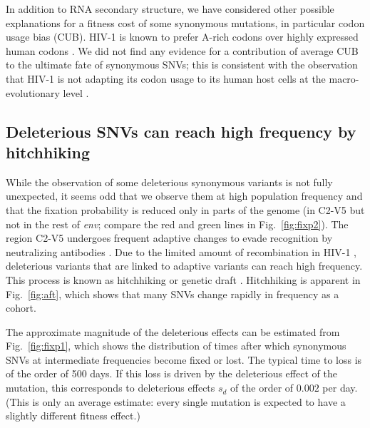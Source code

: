 \documentclass[11pt]{article}
\newcommand{\FIG}[1]{Fig.~\ref{fig:#1}}
\newcommand{\env}{\textit{env}}
\newcommand{\shankaregion}{C2-V5}
\begin{document}
In addition to RNA secondary structure, we have considered other possible
explanations for a fitness cost of some synonymous mutations, in particular
codon usage bias (CUB). HIV-1 is known to prefer A-rich codons over highly
expressed human codons \citep{jenkins_extent_2003, kuyl_biased_2012}. We
did not find any evidence for a contribution of average CUB to the ultimate
fate of synonymous SNVs; this is consistent with the observation that HIV-1 is not
adapting its codon usage to its human host cells at the macro-evolutionary level
\citep{kuyl_biased_2012}.


\subsection*{Deleterious SNVs can reach high frequency by hitchhiking}
While the observation of some deleterious synonymous variants is not fully
unexpected, it seems odd that we observe them at high population
frequency and that the fixation probability is reduced only in parts of the
genome (in \shankaregion{} but not in the rest of \env{}; compare the red
and green lines in \FIG{fixp2}).
The region \shankaregion{} undergoes frequent adaptive changes to evade
recognition by neutralizing antibodies \cite{williamson_adaptation_2003,wei_antibody_2003,
richman_rapid_2003}. Due to the limited amount of recombination in HIV-1
\cite{neher_recombination_2010, batorsky_estimate_2011}, deleterious variants
that are linked to adaptive variants can reach high frequency. This process is
known as hitchhiking \citep{smith_hitch-hiking_1974} or genetic draft
\citep{gillespie_genetic_2000,neher_genetic_2011}. Hitchhiking is apparent in
\FIG{aft}, which shows that many SNVs change rapidly in frequency as a
cohort. 

The approximate magnitude of the deleterious effects can be estimated from
\FIG{fixp1}, which shows the distribution of times after which synonymous
SNVs at intermediate frequencies become fixed or lost. The typical time to
loss is of the order of 500 days. If this loss is driven by the deleterious
effect of the mutation, this corresponds to deleterious effects $s_d$ of the
order of $0.002$ per day. (This is only an average estimate: every single
mutation is expected to have a slightly different fitness effect.)
\end{document}
